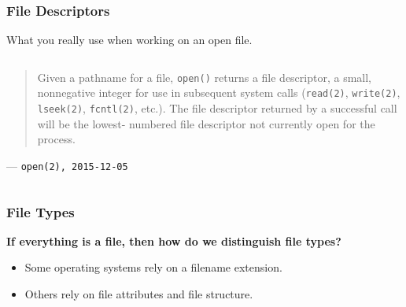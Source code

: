 \begin{frame}

\frametitle{File Descriptors}

\begin{center}

\item What you really use when working on an open file.

\end{center}

\vspace{\fill}


\begin{columns}

\column{\dimexpr\paperwidth-50pt}

\begin{flushright}

\begin{quote}

Given  a  pathname  for  a  file, \texttt{open()} returns a file descriptor,
a small, nonnegative integer for use in subsequent system calls
(\texttt{read(2)}, \texttt{write(2)}, \texttt{lseek(2)}, \texttt{fcntl(2)},
etc.).  The file descriptor returned by a successful call will be  the  lowest-
numbered file descriptor not currently open for the process.

\end{quote}

--- \texttt{open(2), 2015-12-05}

\end{flushright}

\end{columns}

\end{frame}







\begin{frame}

\frametitle{File Types}

\begin{center}

\textbf{If everything is a file, then how do we distinguish file types?}

\end{center}

\begin{itemize}

\item Some operating systems rely on a filename extension.

\item Others rely on file attributes and file structure.

\end{itemize}

\end{frame}



